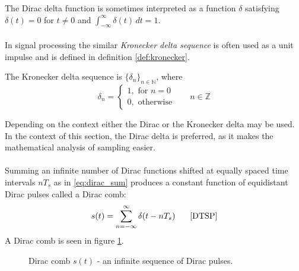 The Dirac delta function is sometimes interpreted as a function $\delta$ satisfying $\delta(t)=0$ for $t\neq 0$ and $\int_{-\infty}^{\infty}\!\delta(t)\,dt=1$.\\\\
In signal processing the similar \textit{Kronecker delta sequence} is often used as a unit impulse and is defined in definition \ref{def:kronecker}.
\begin{definition}\label{def:kronecker}
The Kronecker delta sequence is $\{\delta_n\}_{n\in\mathbb{N}}$, where
\begin{equation}
\delta_n=
\begin{cases}1,\text{ for }n=0\\
0,\text{ otherwise}
\end{cases}\phantom{mm}n\in\mathbb{Z}
\end{equation}
\end{definition}
Depending on the context either the Dirac or the Kronecker delta may be used. In the context of this section, the Dirac delta is preferred, as it makes the mathematical analysis of sampling easier.\\\\
Summing an infinite number of Dirac functions shifted at equally spaced time intervals $nT_s$ as in \eqref{eq:dirac_sum} produces a constant function of equidistant Dirac pulses called a Dirac comb:
\begin{equation}\label{eq:dirac_sum}
s(t)=\sum_{n=-\infty}^{\infty}\delta(t-nT_s)\phantom{mm}\text{\cite{DTSP}}
\end{equation}
A Dirac comb is seen in figure \ref{fig:dirac_comb}.
\begin{figure}[H]
\centering
{}
\caption{Dirac comb $s(t)$ - an infinite sequence of Dirac pulses.}
\label{fig:dirac_comb}
\end{figure}
